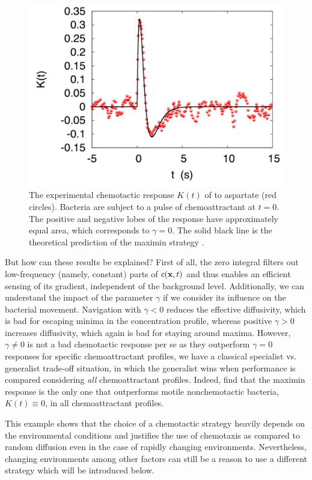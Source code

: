 \begin{figure}[bth]
 \myfloatalign
 \includegraphics[width=0.8\linewidth]{gfx/experimental-bacterial-response}
 \caption[]{The experimental chemotactic response $K(t)$ of \ecoli to aspartate (red circles). Bacteria are subject to a pulse of chemoattractant at $t=0$. The positive and negative lobes of the response have approximately equal area, which corresponds to $\gamma = 0$. The solid black line is the theoretical prediction of the maximin strategy \cite{celani:2010}.}\label{fig:experimental-bacterial-response}
\end{figure}

But how can these results be explained? First of all, the zero integral filters out low-frequency (namely, constant) parts of $c(\mathbf{x},t)$ and thus enables an efficient sensing of its gradient, independent of the background level. Additionally, we can understand the impact of the parameter $\gamma$ if we consider its influence on the bacterial movement. Navigation with $\gamma < 0$ reduces the effective diffusivity, which is bad for escaping minima in the concentration profile, whereas positive $\gamma >0 $ increases diffusivity, which again is bad for staying around maxima. However, $\gamma \neq 0$ is not a bad chemotactic response per se as they outperform $\gamma = 0$ responses for specific chemoattractant profiles, \ie we have a classical specialist vs. generalist trade-off situation, in which the generalist wins when performance is compared considering \emph{all} chemoattractant profiles. Indeed, \citeauthor{celani:2010} find that the maximin response is the only one that outperforms motile nonchemotactic bacteria, \ie $K(t) \equiv 0$, in all chemoattractant profiles.

This example shows that the choice of a chemotactic strategy heavily depends on the environmental conditions and justifies the use of chemotaxis as compared to random diffusion even in the case of rapidly changing environments. Nevertheless, changing environments among other factors can still be a reason to use a different strategy which will be introduced below.


